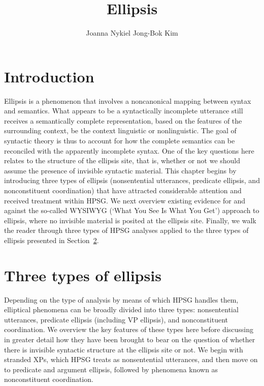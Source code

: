 \documentclass[output=paper
                ,modfonts
                ,nonflat
	        ,collection
	        ,collectionchapter
	        ,collectiontoclongg
 	        ,biblatex
                ,babelshorthands
                ,newtxmath
                ,draftmode
                ,colorlinks, citecolor=brown
]{./langsci/langscibook}
\author{%
	Joanna Nykiel\affiliation{Kyung Hee University, Seoul}%
	\lastand Jong-Bok Kim\affiliation{Kyung Hee University, Seoul}%
}
\title{Ellipsis}
\begin{document}
\maketitle
\label{chap-ellipsis}

{

\section{Introduction}
\label{ellipsis-sec-introduction}

         Ellipsis is a phenomenon that involves a noncanonical mapping between syntax and semantics. What appears to be a syntactically incomplete utterance still receives a semantically complete representation, based on the features of the surrounding context, be the context linguistic or nonlinguistic. The goal of syntactic theory is thus to account for how the complete semantics can be reconciled with the apparently incomplete syntax. One of the key questions here relates to the structure of the ellipsis site, that is, whether or not we should assume the presence of invisible syntactic material. This chapter begins by introducing three types of ellipsis (nonsentential utterances, predicate ellipsis, and nonconstituent coordination) that have attracted considerable attention and received treatment within HPSG. We next overview existing evidence for and against the so-called WYSIWYG (`What You See Is What You Get') approach to ellipsis, where no invisible material is posited at the ellipsis site. Finally, we walk the reader through three types of HPSG analyses applied to the three types of ellipsis presented in Section~\ref{sec-three-types-of-ellipsis}.


\section{Three types of ellipsis}
\label{sec-three-types-of-ellipsis}

Depending on the type of analysis by means of which HPSG handles them, elliptical phenomena can be broadly divided into three types:
nonsentential utterances, predicate ellipsis (including VP ellipsis), and nonconstituent coordination.
We overview the key features of these types here before discussing in greater detail how they have been brought to bear on the question of whether there is invisible syntactic structure at the ellipsis site or not. We begin with stranded XPs, which HPSG treats as nonsentential utterances, and then move on to predicate and argument ellipsis, followed by phenomena known as nonconstituent coordination.

}
\end{document}
